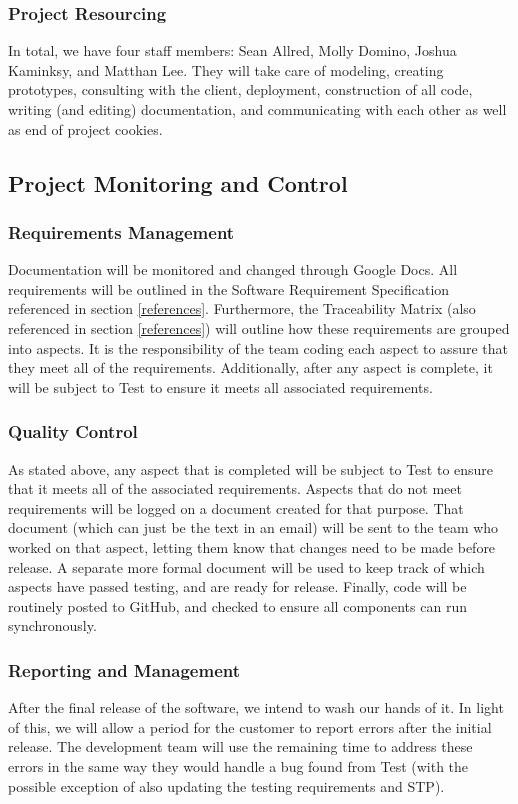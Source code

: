\documentclass{article}
\begin{document}
\subsubsection{Project Resourcing}
In total, we have four staff members: Sean Allred, Molly Domino, Joshua Kaminksy, and Matthan Lee.  They will take care of modeling, creating prototypes, consulting with the client, deployment, construction of all code, writing (and editing) documentation, and communicating with each other as well as end of project cookies.
\subsection{Project Monitoring and Control}
\subsubsection{Requirements Management}
Documentation will be monitored and changed through Google Docs.  All requirements will be outlined in the Software Requirement Specification referenced in section \ref{references}. Furthermore, the Traceability Matrix (also referenced in section \ref{references}) will outline how these requirements are grouped into aspects.  It is the responsibility of the team coding each aspect to assure that they meet all of the requirements.  Additionally, after any aspect is complete, it will be subject to Test to ensure it meets all associated requirements.
\subsubsection{Quality Control}
As stated above, any aspect that is completed will be subject to Test to ensure that it meets all of the associated requirements.  Aspects that do not meet requirements will be logged on a document created for that purpose.  That document (which can just be the text in an email) will be sent to the team who worked on that aspect, letting them know that changes need to be made before release.  A separate more formal document will be used to keep track of which aspects have passed testing, and are ready for release.  Finally, code will be routinely posted to GitHub, and checked to ensure all components can run synchronously.

\subsubsection{Reporting and Management}
After the final release of the software, we intend to wash our hands of it.  In light of this, we will allow a period for the customer to report errors after the initial release.  The development team will use the remaining time to address these errors in the same way they would handle a bug found from Test (with the possible exception of also updating the testing requirements and STP).
\end{document}
